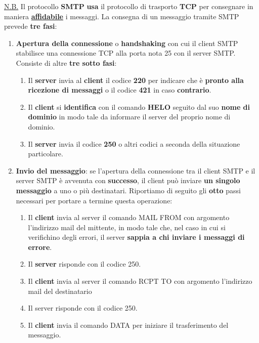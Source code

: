 \documentclass[11pt,a4paper,oneside]{book}
\theoremstyle{definition}
\begin{document}
\pagebreak

\underline{N.B.} Il protocollo \textbf{SMTP} \textbf{usa} il protocollo di trasporto \textbf{TCP} per consegnare in maniera \textbf{\underline{affidabile}} i messaggi.\newline\newline
La consegna di un messaggio tramite SMTP prevede \textbf{tre fasi}:
\begin{enumerate}
	\item \textbf{Apertura della connessione} o \textbf{handshaking} con cui il client SMTP stabilisce una connessione TCP alla porta nota 25 con il server SMTP. Consiste di altre \textbf{tre sotto fasi}:
	      \begin{enumerate}[label*=\arabic*.]
		      \item Il \textbf{server} invia al \textbf{client} il codice \textbf{220} per indicare che è \textbf{pronto alla ricezione di messaggi} o il codice \textbf{421} in caso \textbf{contrario}.
		      \item Il \textbf{client} si \textbf{identifica} con il comando \textbf{HELO} seguito dal suo \textbf{nome di dominio} in modo tale da informare il server del proprio nome di dominio.
		      \item Il \textbf{server} invia il codice \textbf{250} o altri codici a seconda della situazione particolare.
	      \end{enumerate}
	\item \textbf{Invio del messaggio}: se l'apertura della connessione tra il client SMTP e il server SMTP è avvenuta con \textbf{successo}, il client può inviare \textbf{un singolo messaggio} a uno o più destinatari. Riportiamo di seguito gli \textbf{otto} passi necessari per portare a termine questa operazione:
	      \begin{enumerate}[label*=\arabic*.]
		      \item Il \textbf{client} invia al server il comando MAIL FROM con argomento l'indirizzo mail del mittente, in modo tale che, nel caso in cui si verifichino degli  errori, il server \textbf{sappia a chi inviare i messaggi di errore}.
		      \item Il \textbf{server} risponde con il codice 250.
		      \item Il \textbf{client} invia al server il comando RCPT TO con argomento l'indirizzo mail del destinatario
		      \item Il server risponde con il codice 250.
		      \item Il \textbf{client} invia il comando DATA per iniziare il trasferimento del messaggio.

\end{enumerate}
\end{enumerate}
\end{document}
